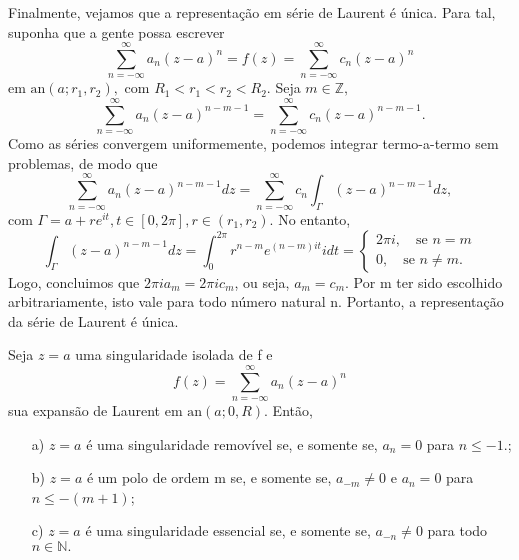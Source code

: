 \documentclass[complex.tex]{subfiles}
\begin{document}
\begin{proof*}
	Finalmente, vejamos que a representação em série de Laurent é única. Para tal, suponha que a gente possa escrever
	\[
		\sum\limits_{n=-\infty}^{\infty}a_{n}(z-a)^{n} = f(z) = \sum\limits_{n=-\infty}^{\infty}c_{n}(z-a)^{n}
	\]
	em \(\mathrm{an}(a; r_{1}, r_{2}),\) com \(R_{1} < r_{1} < r_{2} < R_{2}.\) Seja \(m\in \mathbb{Z},\)
	\[
		\sum\limits_{n=-\infty}^{\infty}a_{n}(z-a)^{n-m-1} = \sum\limits_{n=-\infty}^{\infty}c_{n}(z-a)^{n-m-1}.
	\]
	Como as séries convergem uniformemente, podemos integrar termo-a-termo sem problemas, de modo que
	\[
		\sum\limits_{n=-\infty}^{\infty}a_{n}(z-a)^{n-m-1}dz = \sum\limits_{n=-\infty}^{\infty}c_{n}\int_{\Gamma }^{}(z-a)^{n-m-1}dz,
	\]
	com \(\Gamma = a + r e^{it}, t\in [0, 2\pi ], r\in (r_{1}, r_{2}).\) No entanto,
	\[
		\int_{\Gamma }^{}(z-a)^{n-m-1}dz = \int_{0}^{2\pi }r^{n-m}e^{(n-m)it}idt  = \left\{\begin{array}{ll}
			2\pi i,\quad \text{se } n =m \\
			0,\quad \text{se } n\neq m.
		\end{array}\right.
	\]
	Logo, concluimos que \(2\pi i a_{m} = 2\pi i c_{m}\), ou seja, \(a_{m}=c_{m}.\) Por m ter sido escolhido arbitrariamente,
	isto vale para todo número natural n. Portanto, a representação da série de Laurent é única. \qedsymbol
\end{proof*}
\begin{crl*}
	Seja \(z=a\) uma singularidade isolada de f e
	\[
		f(z) = \sum\limits_{n=-\infty}^{\infty}a_{n}(z-a)^{n}
	\]
	sua expansão de Laurent em \(\mathrm{an}(a; 0, R).\) Então,
	\begin{itemize}
		\item[a)] \(z=a\) é uma singularidade removível se, e somente se, \(a_{n} = 0\) para \(n\leq -1.\);
		\item[b)] \(z=a\) é um polo de ordem m se, e somente se, \(a_{-m}\neq0\) e \(a_{n}=0\) para \(n\leq -(m+1)\);
		\item[c)] \(z=a\) é uma singularidade essencial se, e somente se, \(a_{-n}\neq0\) para todo \(n\in \mathbb{N}.\)
	\end{itemize}
\end{crl*}
\end{document}
